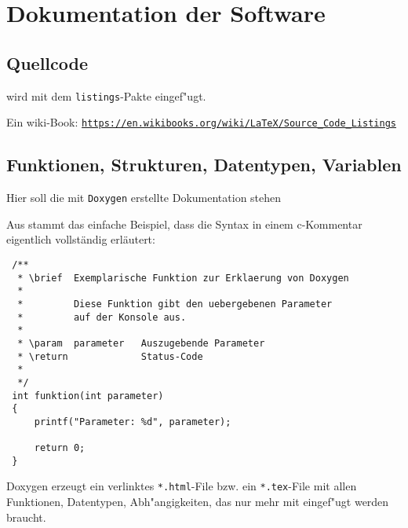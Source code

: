 \chapter{Dokumentation der Software}
	\section{Quellcode}
		wird mit dem \verb"listings"-Pakte eingef"ugt.
		  		
		Ein wiki-Book: \href{https://en.wikibooks.org/wiki/LaTeX/Source_Code_Listings}{\texttt{https://en.wikibooks.org/wiki/LaTeX/Source\_Code\_Listings}}
		  		
		  		
	\section{Funktionen, Strukturen, Datentypen,  Variablen}
		Hier soll die mit \verb"Doxygen" \cite[S.~3]{wiki:doxygen} erstellte Dokumentation stehen
		  		
		Aus \cite{wiki:doxygen} stammt das einfache Beispiel, dass die Syntax in einem c-Kommentar eigentlich vollständig erläutert:

\begin{verbatim}
 /**
  * \brief  Exemplarische Funktion zur Erklaerung von Doxygen
  *
  *         Diese Funktion gibt den uebergebenen Parameter
  *         auf der Konsole aus.
  *
  * \param	parameter   Auszugebende Parameter
  * \return	            Status-Code
  *
  */
 int funktion(int parameter)
 {
     printf("Parameter: %d", parameter);   

     return 0;
 }
\end{verbatim}		 

	Doxygen erzeugt ein verlinktes \verb|*.html|-File bzw. ein \verb|*.tex|-File mit allen Funktionen, Datentypen, Abh"angigkeiten, das nur mehr mit \verb|| eingef"ugt werden braucht. 
		  		
		  		